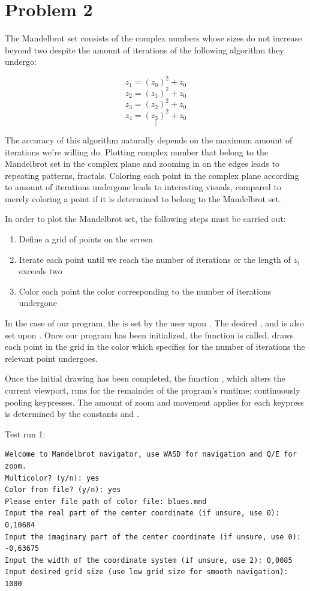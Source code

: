 \section*{Problem 2}
The Mandelbrot set consists of the complex numbers whose sizes do not increase beyond two despite the amount of iterations of the following algorithm they undergo:

\[ z_{1} = (z_{0})^2 + z_{0}  \]
\[ z_{2} = (z_{1})^2 + z_{0}  \]
\[ z_{3} = (z_{2})^2 + z_{0}  \]
\[ z_{4} = (z_{3})^2 + z_{0}  \]
\[ \vdots \]

The accuracy of this algorithm naturally depends on the maximum amount of iterations we're willing do.
Plotting complex number that belong to the Mandelbrot set in the complex plane and zooming in on the edges leads to repeating patterns, fractals.
Coloring each point in the complex plane according to amount of iterations undergone leads to interesting visuals, compared to merely coloring a point if it is determined to belong to the Mandelbrot set.

In order to plot the Mandelbrot set, the following steps must be carried out:
\begin{enumerate}
\item Define a grid of points on the screen
\item Iterate each point until we reach the  number of iterations or the length of $z_{i}$ exceeds two
\item Color each point the color corresponding to the number of iterations undergone
\end{enumerate}

In the case of our program, the  is set by the user upon .
The desired ,  and  is also set upon .
Once our program has been initialized, the function  is called.
 draws each point in the grid in the color which  specifies for the number of iterations the relevant point undergoes. 

Once the initial drawing has been completed, the function , which alters the current viewport, runs for the remainder of the program's runtime; continuously pooling keypresses. The amount of zoom and movement  applies for each keypress is determined by the constants  and .

\newpage
Test run 1:
\begin{Verbatim}
Welcome to Mandelbrot navigator, use WASD for navigation and Q/E for zoom.
Multicolor? (y/n): yes
Color from file? (y/n): yes
Please enter file path of color file: blues.mnd
Input the real part of the center coordinate (if unsure, use 0): 0,10684
Input the imaginary part of the center coordinate (if unsure, use 0): -0,63675
Input the width of the coordinate system (if unsure, use 2): 0,0085
Input desired grid size (use low grid size for smooth navigation): 1000
\end{Verbatim}

